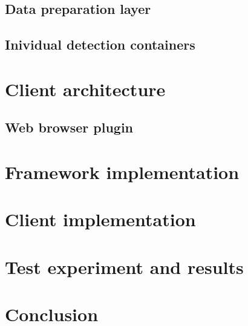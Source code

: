 \section{Data preparation layer}
\section{Inividual detection containers}

\chapter{Client architecture}
\section{Web browser plugin}

\chapter{Framework implementation}

\chapter{Client implementation}

\chapter{Test experiment and results}

\chapter{Conclusion}